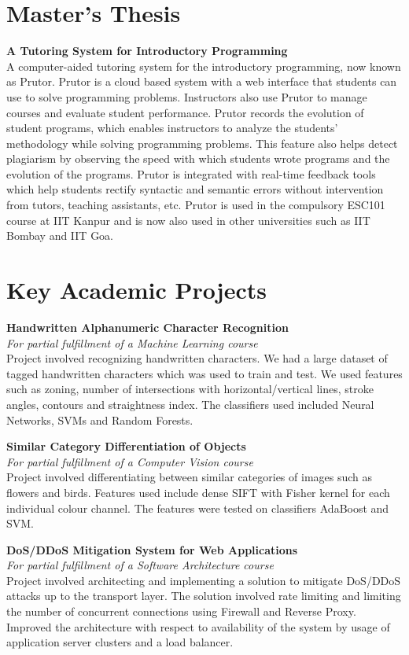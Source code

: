 \documentclass[margin,line]{res}
\begin{document}
\begin{resume}
\section{\sc Master's Thesis}
{\bf A Tutoring System for Introductory Programming} \\
A computer-aided tutoring system for the introductory programming, now known as Prutor. Prutor is a cloud based system with a web interface that students can use to solve programming problems. Instructors also use Prutor to manage courses and evaluate student performance. Prutor records the evolution of student programs, which enables instructors to analyze the students’ methodology while solving programming problems. This feature also helps detect plagiarism by observing the speed with which students wrote programs and the evolution of the programs. Prutor is integrated with real-time feedback tools which help students rectify syntactic and semantic errors without intervention from tutors, teaching assistants, etc. Prutor is used in the compulsory ESC101 course at IIT Kanpur and is now also used in other universities such as IIT Bombay and IIT Goa.

\section{\sc Key Academic Projects}

{\bf Handwritten Alphanumeric Character Recognition} \\
{\em For partial fulfillment of a Machine Learning course} \\
Project involved recognizing handwritten characters. We had a large dataset of tagged handwritten characters which was used to train and test. We used features such as zoning, number of intersections with horizontal/vertical lines, stroke angles, contours and straightness index. The classifiers used included Neural Networks, SVMs and Random Forests.

{\bf Similar Category Differentiation of Objects} \\
{\em For partial fulfillment of a Computer Vision course} \\
Project involved differentiating between similar categories of images such as flowers and birds. Features used include dense SIFT with Fisher kernel for each individual colour channel. The features were tested on classifiers AdaBoost and SVM.

{\bf DoS/DDoS Mitigation System for Web Applications} \\
{\em For partial fulfillment of a Software Architecture course} \\
Project involved architecting and implementing a solution to mitigate DoS/DDoS attacks up to the transport layer. The solution involved rate limiting and limiting the number of concurrent connections using Firewall and Reverse Proxy. Improved the architecture with respect to  availability of the system by usage of application server clusters and a load balancer.


\end{resume}
\end{document}
